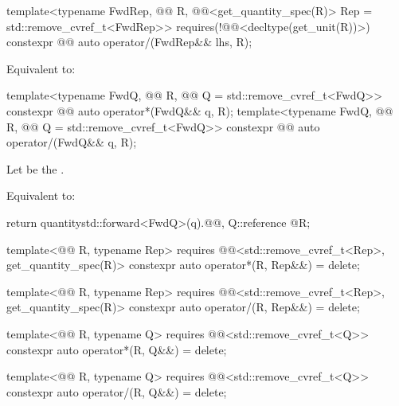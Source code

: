 \begin{itemdecl}
template<typename FwdRep, @@ R,
         @@<get_quantity_spec(R{})> Rep = std::remove_cvref_t<FwdRep>>
  requires(!@@<decltype(get_unit(R{}))>)
constexpr @@ auto operator/(FwdRep&& lhs, R);
\end{itemdecl}

\begin{itemdescr}
\pnum
\effects
Equivalent to:
\end{itemdescr}

\begin{itemdecl}
template<typename FwdQ, @@ R, @@ Q = std::remove_cvref_t<FwdQ>>
constexpr @@ auto operator*(FwdQ&& q, R);
template<typename FwdQ, @@ R, @@ Q = std::remove_cvref_t<FwdQ>>
constexpr @@ auto operator/(FwdQ&& q, R);
\end{itemdecl}

\begin{itemdescr}
\pnum
Let  be the .

\pnum
\effects
Equivalent to:
\begin{codeblock}
return quantity{std::forward<FwdQ>(q).@@, Q::reference @\atsign@ R{}};
\end{codeblock}
\end{itemdescr}

\begin{itemdecl}
template<@@ R, typename Rep>
  requires @@<std::remove_cvref_t<Rep>, get_quantity_spec(R{})>
constexpr auto operator*(R, Rep&&) = delete;

template<@@ R, typename Rep>
  requires @@<std::remove_cvref_t<Rep>, get_quantity_spec(R{})>
constexpr auto operator/(R, Rep&&) = delete;

template<@@ R, typename Q>
  requires @@<std::remove_cvref_t<Q>>
constexpr auto operator*(R, Q&&) = delete;

template<@@ R, typename Q>
  requires @@<std::remove_cvref_t<Q>>
constexpr auto operator/(R, Q&&) = delete;
\end{itemdecl}

